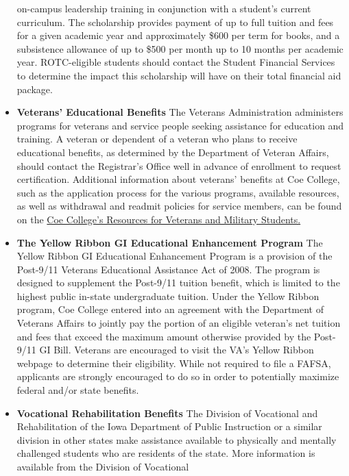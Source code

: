 \documentclass[
  letterpaper,
]{scrbook}
\begin{document}
\begin{itemize}
  on-campus leadership training in conjunction with a student's current
  curriculum. The scholarship provides payment of up to full tuition and
  fees for a given academic year and approximately \$600 per term for
  books, and a subsistence allowance of up to \$500 per month up to 10
  months per academic year. ROTC-eligible students should contact the
  Student Financial Services to determine the impact this scholarship
  will have on their total financial aid package.
\item
  \textbf{Veterans' Educational Benefits} The Veterans Administration
  administers programs for veterans and service people seeking
  assistance for education and training. A veteran or dependent of a
  veteran who plans to receive educational benefits, as determined by
  the Department of Veteran Affairs, should contact the Registrar's
  Office well in advance of enrollment to request certification.
  Additional information about veterans' benefits at Coe College, such
  as the application process for the various programs, available
  resources, as well as withdrawal and readmit policies for service
  members, can be found on the
  \href{https://www.coe.edu/admission/financial-aid-scholarships/resources/veterans-and-military-benefits}{Coe
  College's Resources for Veterans and Military Students.}
\item
  \textbf{The Yellow Ribbon GI Educational Enhancement Program} The
  Yellow Ribbon GI Educational Enhancement Program is a provision of the
  Post-9/11 Veterans Educational Assistance Act of 2008. The program is
  designed to supplement the Post-9/11 tuition benefit, which is limited
  to the highest public in-state undergraduate tuition. Under the Yellow
  Ribbon program, Coe College entered into an agreement with the
  Department of Veterans Affairs to jointly pay the portion of an
  eligible veteran's net tuition and fees that exceed the maximum amount
  otherwise provided by the Post-9/11 GI Bill. Veterans are encouraged
  to visit the VA's Yellow Ribbon webpage to determine their
  eligibility. While not required to file a FAFSA, applicants are
  strongly encouraged to do so in order to potentially maximize federal
  and/or state benefits.
\item
  \textbf{Vocational Rehabilitation Benefits} The Division of Vocational
  and Rehabilitation of the Iowa Department of Public Instruction or a
  similar division in other states make assistance available to
  physically and mentally challenged students who are residents of the
  state. More information is available from the Division of Vocational

\end{itemize}
\end{document}
